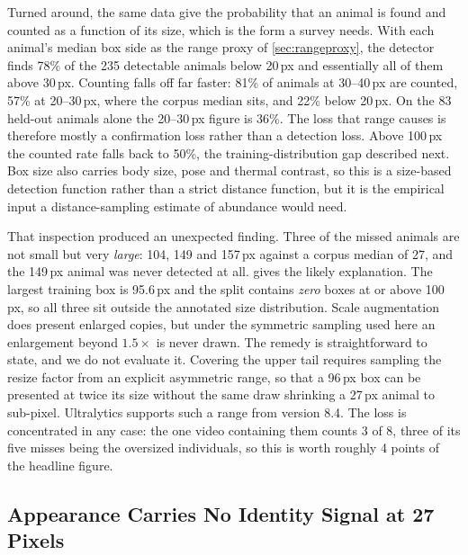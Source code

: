 Turned around, the same data give the probability that an animal is found and counted as a
function of its size, which is the form a survey needs. With each animal's median box side
as the range proxy of \cref{sec:rangeproxy}, the detector finds 78\% of the 235 detectable
animals below 20\,px and essentially all of them above 30\,px. Counting falls off far faster: 81\% of animals at 30--40\,px are counted, 57\% at 20--30\,px, where the corpus
median sits, and 22\% below 20\,px. On the 83 held-out animals alone the 20--30\,px figure
is 36\%. The loss that range causes is therefore mostly a confirmation loss rather than a
detection loss. Above 100\,px the counted rate falls back to 50\%, the
training-distribution gap described next. Box size also carries body size, pose and thermal
contrast, so this is a size-based detection function rather than a strict distance
function, but it is the empirical input a distance-sampling estimate of abundance would
need.

That inspection produced an unexpected finding. Three of the missed animals are not small
but very \emph{large}: 104, 149 and 157\,px against a corpus median of 27, and the 149\,px
animal was never detected at all.  gives the likely explanation. The largest
training box is 95.6\,px and the split contains \emph{zero} boxes at or above 100\,px, so
all three sit outside the annotated size distribution. Scale augmentation does present
enlarged copies, but under the symmetric sampling used here an enlargement beyond
$1.5\times$ is never drawn. The remedy is straightforward to state, and we do not evaluate it. Covering the upper tail
requires sampling the resize factor from an explicit asymmetric range, so that a 96\,px box
can be presented at twice its size without the same draw shrinking a 27\,px animal to sub-pixel. Ultralytics supports such a range from version 8.4. The loss is concentrated in
any case: the one video containing them counts 3 of 8, three of its five misses being the
oversized individuals, so this is worth roughly 4 points of the headline figure.

\subsection{Appearance Carries No Identity Signal at 27 Pixels}
\label{sec:reid}

